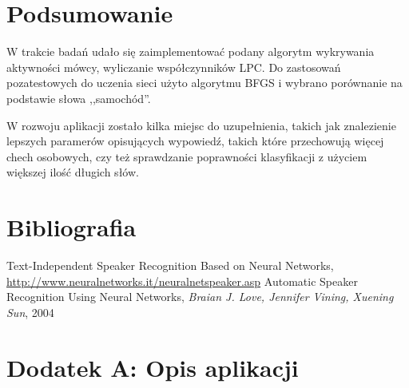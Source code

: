 \documentclass[a4paper]{article}
\begin{document}
\section{Podsumowanie}

W trakcie badań udało się zaimplementować podany algorytm wykrywania aktywności
mówcy, wyliczanie współczynników LPC. Do zastosowań pozatestowych do uczenia
sieci użyto algorytmu BFGS i wybrano porównanie na podstawie słowa ,,samochód''.

W rozwoju aplikacji zostało kilka miejsc do uzupełnienia, takich jak
znalezienie lepszych paramerów opisujących wypowiedź, takich które przechowują
więcej chech osobowych, czy też sprawdzanie poprawności klasyfikacji z użyciem
większej ilość długich słów.

\section{Bibliografia}
\begin{thebibliography}{123}
    Text-Independent Speaker Recognition Based on Neural Networks,
        \url{http://www.neuralnetworks.it/neuralnetspeaker.asp}
    Automatic Speaker Recognition Using Neural Networks, \emph{Braian
        J. Love, Jennifer Vining, Xuening Sun}, 2004
\end{thebibliography}

\section{Dodatek A: Opis aplikacji}
\end{document}
